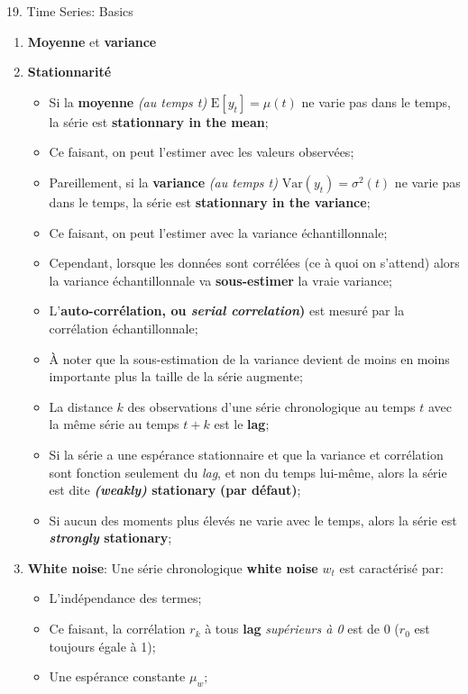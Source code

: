 \documentclass[12pt, titlepage, french]{report}
\begin{document}
\begin{CHPT_SUMM}[label = {timeseries19}]{19. Time Series: Basics}
\begin{enumerate}
\begin{itemize}
		\end{itemize} 
	\item	\textbf{Moyenne} et \textbf{variance}
	\item[]	\textbf{Stationnarité}
		\begin{itemize}
		\item	Si la \textbf{moyenne} \textit{(au temps t)} $\text{E}[y_{t}] = \mu(t)$ ne varie pas dans le temps, la série est \textbf{stationnary in the mean};
		\item[]	Ce faisant, on peut l'estimer avec les valeurs observées;
		\item	Pareillement, si la \textbf{variance} \textit{(au temps t)} $\text{Var}(y_{t}) = \sigma^{2}(t)$ ne varie pas dans le temps, la série est \textbf{stationnary in the variance};
		\item[]	Ce faisant, on peut l'estimer avec la variance échantillonnale;
		\item	Cependant, lorsque les données sont corrélées (ce à quoi on s'attend) alors la variance échantillonnale va \textbf{sous-estimer} la vraie variance;
		\item	L'\textbf{auto-corrélation, ou \textit{serial correlation})} est mesuré par la corrélation échantillonnale;
		\item[]	À noter que la sous-estimation de la variance devient de moins en moins importante plus la taille de la série augmente;
		\item	La distance $k$ des observations d'une série chronologique au temps $t$ avec la même série au temps $t + k$ est le \textbf{lag};
		\item	Si la série a une espérance stationnaire et que la variance et corrélation sont fonction seulement du \textit{lag}, et non du temps lui-même, alors la série est dite \textbf{\textit{(weakly)} stationary} \textbf{(par défaut)};
		\item	Si aucun des moments plus élevés ne varie avec le temps, alors la série est \textbf{\textit{strongly} stationary};
		\end{itemize}
	\item	\textbf{White noise}: Une série chronologique \textbf{white noise}  $w_{t}$ est caractérisé par:
	\begin{itemize}
		\item	L'indépendance des termes;
		\item[]	Ce faisant, la corrélation $r_{k}$ à tous \textbf{lag} \textit{supérieurs à 0} est de 0 ($r_{0}$ est toujours égale à 1);
		\item	Une espérance constante $\mu_w$;

\end{itemize}
\end{enumerate}
\end{CHPT_SUMM}
\end{document}
